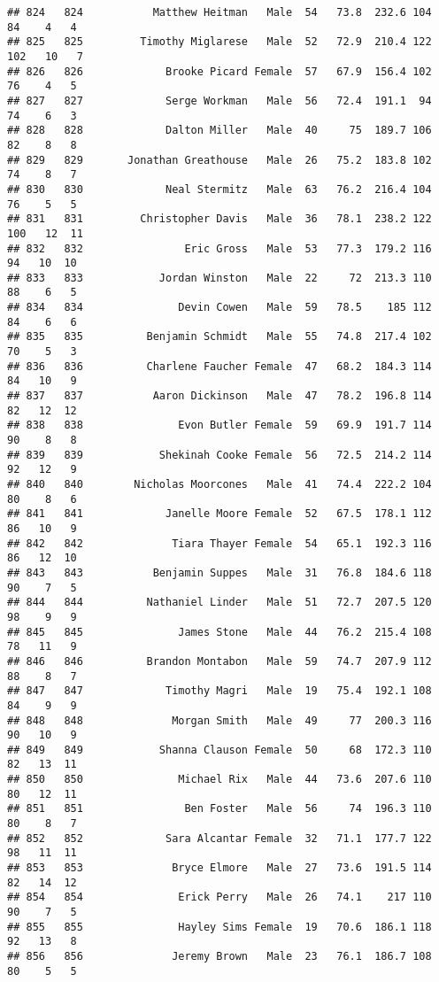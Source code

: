 \documentclass[
]{article}
\begin{document}
\begin{verbatim}
## 824   824           Matthew Heitman   Male  54   73.8  232.6 104  84    4   4
## 825   825         Timothy Miglarese   Male  52   72.9  210.4 122 102   10   7
## 826   826             Brooke Picard Female  57   67.9  156.4 102  76    4   5
## 827   827             Serge Workman   Male  56   72.4  191.1  94  74    6   3
## 828   828             Dalton Miller   Male  40     75  189.7 106  82    8   8
## 829   829       Jonathan Greathouse   Male  26   75.2  183.8 102  74    8   7
## 830   830             Neal Stermitz   Male  63   76.2  216.4 104  76    5   5
## 831   831         Christopher Davis   Male  36   78.1  238.2 122 100   12  11
## 832   832                Eric Gross   Male  53   77.3  179.2 116  94   10  10
## 833   833            Jordan Winston   Male  22     72  213.3 110  88    6   5
## 834   834               Devin Cowen   Male  59   78.5    185 112  84    6   6
## 835   835          Benjamin Schmidt   Male  55   74.8  217.4 102  70    5   3
## 836   836          Charlene Faucher Female  47   68.2  184.3 114  84   10   9
## 837   837           Aaron Dickinson   Male  47   78.2  196.8 114  82   12  12
## 838   838               Evon Butler Female  59   69.9  191.7 114  90    8   8
## 839   839            Shekinah Cooke Female  56   72.5  214.2 114  92   12   9
## 840   840        Nicholas Moorcones   Male  41   74.4  222.2 104  80    8   6
## 841   841             Janelle Moore Female  52   67.5  178.1 112  86   10   9
## 842   842              Tiara Thayer Female  54   65.1  192.3 116  86   12  10
## 843   843           Benjamin Suppes   Male  31   76.8  184.6 118  90    7   5
## 844   844          Nathaniel Linder   Male  51   72.7  207.5 120  98    9   9
## 845   845               James Stone   Male  44   76.2  215.4 108  78   11   9
## 846   846          Brandon Montabon   Male  59   74.7  207.9 112  88    8   7
## 847   847             Timothy Magri   Male  19   75.4  192.1 108  84    9   9
## 848   848              Morgan Smith   Male  49     77  200.3 116  90   10   9
## 849   849            Shanna Clauson Female  50     68  172.3 110  82   13  11
## 850   850               Michael Rix   Male  44   73.6  207.6 110  80   12  11
## 851   851                Ben Foster   Male  56     74  196.3 110  80    8   7
## 852   852             Sara Alcantar Female  32   71.1  177.7 122  98   11  11
## 853   853              Bryce Elmore   Male  27   73.6  191.5 114  82   14  12
## 854   854               Erick Perry   Male  26   74.1    217 110  90    7   5
## 855   855               Hayley Sims Female  19   70.6  186.1 118  92   13   8
## 856   856              Jeremy Brown   Male  23   76.1  186.7 108  80    5   5

\end{verbatim}
\end{document}

